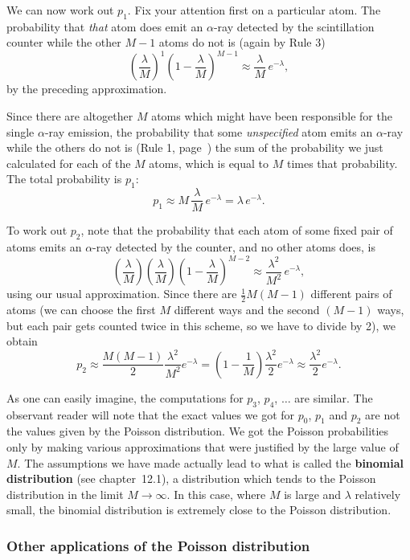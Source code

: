 We can now work out $p_1$. Fix your attention first on a particular
atom.  The probability that {\em that\/} atom does emit an
$\alpha$-ray detected by the scintillation counter while the other
$M-1$ atoms do not is (again by Rule 3)
\[
\left(\dfrac{\lambda}{M}\right)^1
   \left( 1-\dfrac{\lambda}{M}\right)^{M-1}
   \approx \dfrac{\lambda}{M}\,e^{-\lambda},
\]
by the preceding approximation.

Since there are altogether $M$ atoms which might have been responsible
for the single $\alpha$-ray emission, the probability that some {\em
  unspecified\/} atom emits an $\alpha$-ray while the others do not is
(Rule 1, page~\pageref{rule1}) the sum of the probability we just
calculated for each of the $M$ atoms, which is equal to $M$ times that
probability.  The total probability is $p_1$:
\[
p_1 \approx M\,\dfrac{\lambda}{M}\,e^{-\lambda} 
= \lambda \,e^{-\lambda}.
\]

To work out $p_2$, note that the probability that each atom of some
fixed pair of atoms emits an $\alpha$-ray detected by the counter, and
no other atoms does, is
\[
\left( \dfrac{\lambda}{M} \right) \left( \dfrac{\lambda}{M} \right)
  \left(1- \dfrac{\lambda}{M}\right)^{M-2}
  \approx \dfrac{\lambda ^2}{M^2}\, e^{-\lambda},
\]
using our usual approximation.  Since there are $\frac{1}{2}M(M-1)$
different pairs of atoms (we can choose the first $M$ different ways
and the second $(M-1)$ ways, but each pair gets counted twice in this
scheme, so we have to divide by 2), we obtain
\[
p_2 \approx  \dfrac{M(M-1)}{2} \dfrac{\lambda ^2}{M^2}e^{-\lambda}
  =  \left( 1 - \dfrac{1}{M}\right) \dfrac{\lambda ^2}{2}e^{-\lambda}
  \approx \dfrac{\lambda ^2}{2}e^{-\lambda}.
\]

As one can easily imagine, the computations for $p_3$, $p_4$, $\ldots$
are similar.  The observant reader will note that the exact values we
got for $p_0$, $p_1$ and $p_2$ are not the values given by the Poisson
distribution.  We got the Poisson probabilities only by making various
approximations that were justified by the large value of $M$.  The
assumptions we have made actually lead to what is called the {\bf
  binomial distribution} (see chapter~12.1), a distribution which
tends to the Poisson distribution in the limit $M\rightarrow\infty$.
In this case, where $M$ is large and $\lambda$ relatively small, the
binomial distribution is extremely close to the Poisson distribution.

\subsubsection{Other applications of the Poisson distribution}
\label{subsubsec:other-applications-of-the-poisson-distribution}


